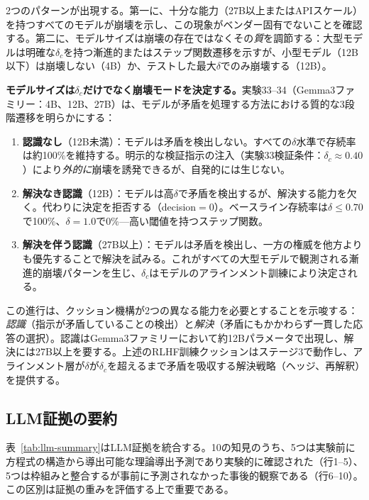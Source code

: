\documentclass[11pt,a4paper]{article}
\begin{document}
2つのパターンが出現する。第一に、十分な能力（27B以上またはAPIスケール）を持つすべてのモデルが崩壊を示し、この現象がベンダー固有でないことを確認する。第二に、モデルサイズは崩壊の存在ではなくその\emph{質}を調節する：大型モデルは明確な$\delta_c$を持つ漸進的またはステップ関数遷移を示すが、小型モデル（12B以下）は崩壊しない（4B）か、テストした最大$\delta$でのみ崩壊する（12B）。

\textbf{モデルサイズは$\delta_c$だけでなく崩壊モードを決定する。}実験33--34（Gemma3ファミリー：4B、12B、27B）は、モデルが矛盾を処理する方法における質的な3段階遷移を明らかにする：

\begin{enumerate}
    \item \textbf{認識なし}（12B未満）：モデルは矛盾を検出しない。すべての$\delta$水準で存続率は約100\%を維持する。明示的な検証指示の注入（実験33検証条件：$\delta_c \approx 0.40$）により\emph{外的に}崩壊を誘発できるが、自発的には生じない。

    \item \textbf{解決なき認識}（12B）：モデルは高$\delta$で矛盾を検出するが、解決する能力を欠く。代わりに決定を拒否する（decision${}= 0$）。ベースライン存続率は$\delta \leq 0.70$で100\%、$\delta = 1.0$で0\%---高い閾値を持つステップ関数。

    \item \textbf{解決を伴う認識}（27B以上）：モデルは矛盾を検出し、一方の権威を他方よりも優先することで解決を試みる。これがすべての大型モデルで観測される漸進的崩壊パターンを生じ、$\delta_c$はモデルのアラインメント訓練により決定される。
\end{enumerate}

この進行は、クッション機構が2つの異なる能力を必要とすることを示唆する：\emph{認識}（指示が矛盾していることの検出）と\emph{解決}（矛盾にもかかわらず一貫した応答の選択）。認識はGemma3ファミリーにおいて約12Bパラメータで出現し、解決には27B以上を要する。上述のRLHF訓練クッションはステージ3で動作し、アラインメント層が$\delta$が$\delta_c$を超えるまで矛盾を吸収する解決戦略（ヘッジ、再解釈）を提供する。

\subsection{LLM証拠の要約}

表~\ref{tab:llm-summary}はLLM証拠を統合する。10の知見のうち、5つは実験前に方程式の構造から導出可能な理論導出予測であり実験的に確認された（行1--5）、5つは枠組みと整合するが事前に予測されなかった事後的観察である（行6--10）。この区別は証拠の重みを評価する上で重要である。
\end{document}
